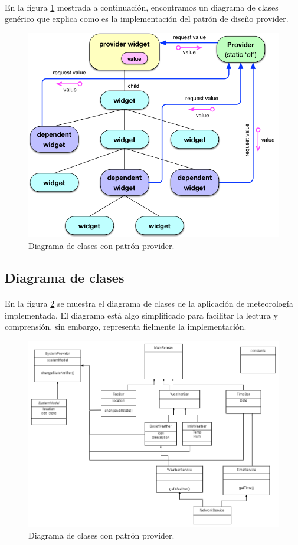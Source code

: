 \paragraph{}En la figura \ref{fig:provider} mostrada a continuación, encontramos un
diagrama de clases genérico que explica como es la implementación del patrón de diseño
provider.

\begin{figure}[H]
	\centering
	\includegraphics[width=0.75\linewidth]{figs/provider-pattern}
	\caption[Patron Provider]{Diagrama de clases con patrón provider.}
	\label{fig:provider}
\end{figure}

\subsection{Diagrama de clases}

\paragraph{}En la figura \ref{fig:classDiagram} se muestra el diagrama de clases de la
aplicación de meteorología implementada. El diagrama está algo simplificado para facilitar
la lectura y comprensión, sin embargo, representa fielmente la implementación.

\begin{figure}[H]
	\centering
	\includegraphics[width=0.95\linewidth]{figs/rpi_weather-class_diagram}
	\caption[Patron Provider]{Diagrama de clases con patrón provider.}
	\label{fig:classDiagram}
\end{figure}

